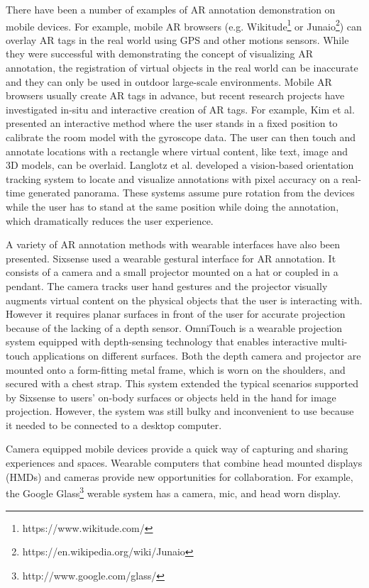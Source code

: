 There have been a number of examples of AR annotation demonstration on mobile devices. For example, mobile AR browsers (e.g. Wikitude\footnote{https://www.wikitude.com/} or Junaio\footnote{https://en.wikipedia.org/wiki/Junaio}) can overlay AR tags in the real world using  GPS and other motions sensors. While they were successful with demonstrating the concept of visualizing AR annotation, the registration of virtual objects in the real world can be inaccurate and they can only be used in outdoor large-scale environments. Mobile AR browsers usually create AR tags in advance, but recent research projects have investigated in-situ and interactive creation of AR tags. For example, Kim et al. \cite{Kim:2011:IAS} presented an interactive method where the user stands in a fixed position to calibrate the room model with the gyroscope data. The user can then touch and annotate locations with a rectangle where virtual content, like text, image and 3D models, can be overlaid.  Langlotz et al. \cite{Langlotz:2012:OCP} developed a vision-based orientation tracking system to locate and visualize annotations with pixel accuracy on a real-time generated panorama. These systems assume pure rotation from the devices while the user has to stand at the same position while doing the annotation, which dramatically reduces the user experience.

A variety of AR annotation methods with wearable interfaces have also been presented. Sixsense \cite{Mistry:2009:WWU} used a wearable gestural interface for AR annotation. It consists of a camera and a small projector mounted on a hat or coupled in a pendant. The camera tracks user hand gestures and the projector visually augments virtual content on the physical objects that the user is interacting with. However it requires planar surfaces in front of the user for accurate projection because of the lacking of a depth sensor. OmniTouch \cite{Harrison:2011:OTW} is a wearable projection system equipped with depth-sensing technology that enables interactive multi-touch applications on different surfaces. Both the depth camera and projector are mounted onto a form-fitting metal frame, which is worn on the shoulders, and secured with a chest strap. This system extended the typical scenarios supported by Sixsense to  users' on-body surfaces or objects held in the hand for image projection. However, the system was still bulky and inconvenient to use because it needed to be connected to a desktop computer.

Camera equipped mobile devices provide a quick way of capturing and sharing experiences and spaces. Wearable
computers that combine head mounted displays (HMDs) and cameras provide new opportunities for collaboration. For example, the Google Glass\footnote{http://www.google.com/glass/} werable system has a camera, mic, and head worn display.

